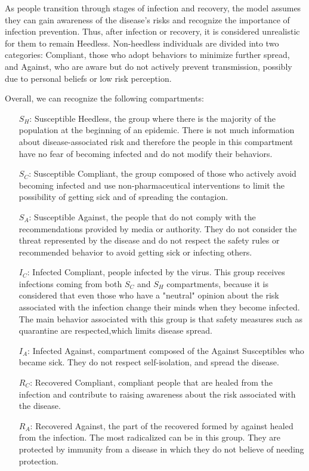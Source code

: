 As people transition through stages of infection and recovery, the model assumes they can gain awareness of the disease's risks and recognize the importance of infection prevention. Thus, after infection or recovery, it is considered unrealistic for them to remain Heedless. Non-heedless individuals are divided into two categories: Compliant, those who adopt behaviors to minimize further spread, and Against, who are aware but do not actively prevent transmission, possibly due to personal beliefs or low risk perception. 

Overall, we can recognize the following compartments:
\begin{itemize}
	\item[$S_H$:] Susceptible Heedless, the group where there is the majority of the population at the beginning of an epidemic. There is not much information about disease-associated risk and therefore the people in this compartment have no fear of becoming infected and do not modify their behaviors.
	\item[$S_C$:] Susceptible Compliant, the group composed of those who actively avoid becoming infected and use non-pharmaceutical interventions to limit the possibility of getting sick and of spreading the contagion.
	\item[$S_A$:] Susceptible Against, the people that do not comply with the recommendations provided by media or authority. They do not consider the threat represented by the disease and do not respect the safety rules or recommended behavior to avoid getting sick or infecting others. 
	\item[$I_C$:] Infected Compliant, people infected by the virus. This group receives infections coming from both $S_C$ and $S_H$ compartments, because it is considered that even those who have a "neutral" opinion about the risk associated with the infection change their minds when they become infected. The main behavior associated with this group is that safety measures such as quarantine are respected,which limits disease spread.
	\item[$I_A$:] Infected Against, compartment composed of the Against Susceptibles who became sick. They do not respect self-isolation, and spread the disease. 
	\item[$R_C$:] Recovered Compliant, compliant people that are healed from the infection and contribute to raising awareness about the risk associated with the disease. 
	\item[$R_A$:] Recovered Against, the part of the recovered formed by against healed from the infection. The most radicalized can be in this group. They are protected by immunity from a disease in which they do not believe of needing protection. 
\end{itemize}

